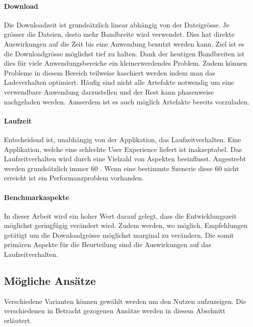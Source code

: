 \paragraph{Download}

Die Downloadzeit ist grundsätzlich linear abhängig von der Dateigrösse.
Je grösser die Dateien, desto mehr Bandbreite wird verwendet. Dies hat direkte Auswirkungen auf die Zeit bis eine Anwendung benutzt werden kann. Ziel ist es die Downloadgrösse möglichst tief zu halten.
Dank der heutigen Bandbreiten ist dies für viele Anwendungsbereiche ein kleinerwerdendes Problem.
Zudem können Probleme in diesem Bereich teilweise kaschiert werden indem man das Ladeverhalten optimiert. Häufig sind nicht alle Artefakte notwendig um eine verwendbare Anwendung darzustellen und der Rest kann phasenweise nachgeladen werden.
Ausserdem ist es auch möglich Artefakte bereits vorzuladen.

\paragraph{Laufzeit}

Entscheidend ist, unabhängig von der Applikation, das Laufzeitverhalten. Eine Applikation, welche eine schlechte User Experience liefert ist inakzeptabel.
Das Laufzeitverhalten wird durch eine Vielzahl von Aspekten beeinflusst.
Angestrebt werden grundsätzlich immer 60 . Wenn eine bestimmte Szenerie diese 60  nicht erreicht ist ein Performanzproblem vorhanden.

\paragraph{Benchmarkaspekte}
In dieser Arbeit wird ein hoher Wert darauf gelegt, dass die Entwicklungszeit möglichst geringfügig verändert wird. Zudem werden, wo möglich, Empfehlungen getätigt um die Downloadgrösse möglichst marginal zu verändern.
Die somit primären Aspekte für die Beurteilung sind die Auswirkungen auf das Laufzeitverhalten.

\subsection{Mögliche Ansätze}

Verschiedene Varianten können gewählt werden um den Nutzen aufzuzeigen. Die verschiedenen in Betracht gezogenen Ansätze werden in diesem Abschnitt erläutert.

